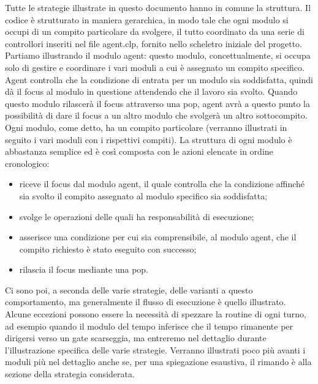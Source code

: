 Tutte le strategie illustrate in questo documento hanno in comune la struttura.
Il codice è strutturato in maniera gerarchica, in modo tale che ogni modulo si occupi di un compito particolare da svolgere, il tutto coordinato da una serie di controllori inseriti nel file {\color{red}agent.clp}, fornito nello scheletro iniziale del progetto.
Partiamo illustrando il modulo agent: questo modulo, concettualmente, si occupa solo di gestire e coordinare i vari moduli a cui è assegnato un compito specifico. Agent controlla che la condizione di entrata per un modulo sia soddisfatta, quindi dà il focus al modulo in questione attendendo che il lavoro sia svolto. Quando questo modulo rilascerà il focus attraverso una pop, agent avrà a questo punto la possibilità di dare il focus a un altro modulo che svolgerà un altro sottocompito.
Ogni modulo, come detto, ha un compito particolare (verranno illustrati in seguito i vari moduli con i rispettivi compiti). La struttura di ogni modulo è abbastanza semplice ed è così composta con le azioni elencate in ordine cronologico: 
\begin{itemize}
	\item riceve il focus dal modulo agent, il quale controlla che la condizione affinché sia svolto il compito assegnato al modulo specifico sia soddisfatta;
	\item svolge le operazioni delle quali ha responsabilità di esecuzione;
	\item asserisce una condizione per cui sia comprensibile, al modulo agent, che il compito richiesto è stato eseguito con successo;
	\item rilascia il focus mediante una pop.
\end{itemize}
Ci sono poi, a seconda delle varie strategie, delle varianti a questo comportamento, ma generalmente il flusso di esecuzione è quello illustrato. Alcune eccezioni possono essere la necessità di spezzare la routine di ogni turno, ad esempio quando il modulo del tempo inferisce che il tempo rimanente per dirigersi verso un gate scarseggia, ma entreremo nel dettaglio durante l'illustrazione specifica delle varie strategie.
Verranno illustrati poco più avanti i moduli più nel dettaglio anche se, per una spiegazione esaustiva, il rimando è alla sezione della strategia considerata.

